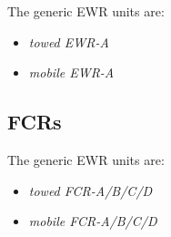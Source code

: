 \documentclass[10pt]{article}
\begin{document}
The generic EWR units are:
\begin{itemize}
\item \emph{towed EWR-A}
\item \emph{mobile EWR-A}
\end{itemize}

\subsection{FCRs}

The generic EWR units are:
\begin{itemize}
\item \emph{towed FCR-A/B/C/D}
\item \emph{mobile FCR-A/B/C/D}
\end{itemize}

\begin{table}
\caption{Generic Units}
\centering
    
\end{table}
\end{document}
